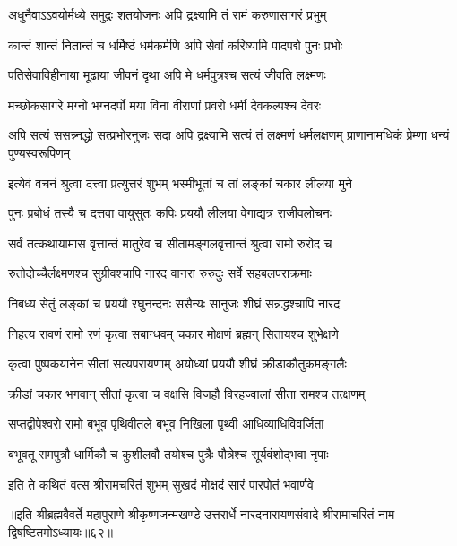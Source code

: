 \twolineshloka
{अधुनैवाऽऽवयोर्मध्ये समुद्रः शतयोजनः}
{अपि द्रक्ष्यामि तं रामं करुणासागरं प्रभुम्}%


\twolineshloka
{कान्तं शान्तं नितान्तं च धर्मिष्ठं धर्मकर्मणि}
{अपि सेवां करिष्यामि पादपद्मे पुनः प्रभोः}%


\twolineshloka
{पतिसेवाविहीनाया मूढाया जीवनं दृथा}
{अपि मे धर्मपुत्रश्च सत्यं जीवति लक्ष्मणः}%


\twolineshloka
{मच्छोकसागरे मग्नो भग्नदर्पो मया विना}
{वीराणां प्रवरो धर्मी देवकल्पश्च देवरः}%


\threelineshloka
{अपि सत्यं ससन्न्नद्धो सत्प्रभोरनुजः सदा} 
{अपि द्रक्ष्यामि सत्यं तं लक्ष्मणं धर्मलक्षणम्}
{प्राणानामधिकं प्रेम्णा धन्यं पुण्यस्वरूपिणम्}%


\twolineshloka
{इत्येवं वचनं श्रुत्वा दत्त्वा प्रत्युत्तरं शुभम्}
{भस्मीभूतां च तां लङ्कां चकार लीलया मुने}%


\twolineshloka
{पुनः प्रबोधं तस्यै च दत्तवा वायुसुतः कपिः}
{प्रययौ लीलया वेगाद्यत्र राजीवलोचनः}%


\twolineshloka
{सर्वं तत्कथायामास वृत्तान्तं मातुरेव च}
{सीतामङ्गलवृत्तान्तं श्रुत्वा रामो रुरोद च}%


\twolineshloka
{रुतोदोच्चैर्लक्ष्मणश्च सुग्रीवश्चापि नारद}
{वानरा रुरुदुः सर्वे सहबलपराक्रमाः}%


\twolineshloka
{निबध्य सेतुं लङ्कां च प्रययौ रघुनन्दनः}
{ससैन्यः सानुजः शीघ्रं सन्नद्धश्चापि नारद}%


\twolineshloka
{निहत्य रावणं रामो रणं कृत्वा सबान्धवम्}
{चकार मोक्षणं ब्रह्मन् सितायश्च शुभेक्षणे}%


\twolineshloka
{कृत्वा पुष्पकयानेन सीतां सत्यपरायणाम्}
{अयोध्यां प्रययौ शीघ्रं क्रीडाकौतुकमङ्गलैः}%


\twolineshloka
{क्रीडां चकार भगवान् सीतां कृत्वा च वक्षसि}
{विजहौ विरहज्वालां सीता रामश्च तत्क्षणम्}%


\twolineshloka
{सप्तद्वीपेश्वरो रामो बभूव पृथिवीतले}
{बभूव निखिला पृथ्वी आधिव्याधिविवर्जिता}%


\twolineshloka
{बभूवतू रामपुत्रौ धार्मिकौ च कुशीलवौ}
{तयोश्च पुत्रैः पौत्रेश्च सूर्यवंशोद्भवा नृपाः}%


\twolineshloka
{इति ते कथितं वत्स श्रीरामचरितं शुभम्}
{सुखदं मोक्षदं सारं पारपोतं भवार्णवे}%

॥इति श्रीब्रह्मवैवर्ते महापुराणे श्रीकृष्णजन्मखण्डे उत्तरार्धे नारदनारायणसंवादे श्रीरामाचरितं नाम द्विषष्टितमोऽध्यायः॥६२॥

\closesection